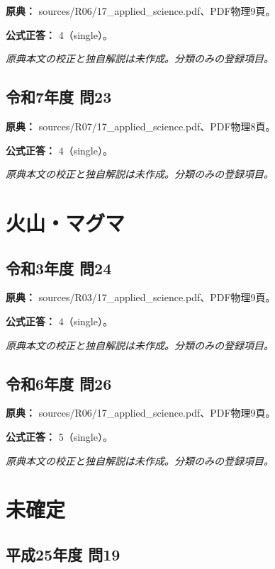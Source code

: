 \noindent\textbf{原典：} sources/R06/17\_applied\_science.pdf、PDF物理9頁。

\textbf{公式正答：} 4（single）。

\par\textit{原典本文の校正と独自解説は未作成。分類のみの登録項目。}

\subsection{令和7年度 問23}
\label{q:r07-reg-applied-23}

\noindent\textbf{原典：} sources/R07/17\_applied\_science.pdf、PDF物理8頁。

\textbf{公式正答：} 4（single）。

\par\textit{原典本文の校正と独自解説は未作成。分類のみの登録項目。}

\section{火山・マグマ}

\subsection{令和3年度 問24}
\label{q:r03-reg-applied-24}

\noindent\textbf{原典：} sources/R03/17\_applied\_science.pdf、PDF物理9頁。

\textbf{公式正答：} 4（single）。

\par\textit{原典本文の校正と独自解説は未作成。分類のみの登録項目。}

\subsection{令和6年度 問26}
\label{q:r06-reg-applied-26}

\noindent\textbf{原典：} sources/R06/17\_applied\_science.pdf、PDF物理9頁。

\textbf{公式正答：} 5（single）。

\par\textit{原典本文の校正と独自解説は未作成。分類のみの登録項目。}

\section{未確定}

\subsection{平成25年度 問19}
\label{q:h25-reg-applied-19}

